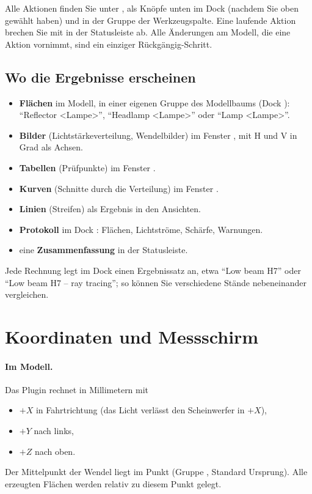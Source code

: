 Alle Aktionen finden Sie unter , als Knöpfe unten im Dock
 (nachdem Sie oben  gewählt haben) und in der Gruppe
 der Werkzeugspalte. Eine laufende Aktion brechen Sie mit  in
der Statusleiste ab. Alle Änderungen am Modell, die eine Aktion vornimmt, sind ein einziger
Rückgängig-Schritt.

\subsection{Wo die Ergebnisse erscheinen}

\begin{itemize}
  \item \textbf{Flächen} im Modell, in einer eigenen Gruppe des Modellbaums (Dock ):
    \enquote{Reflector <Lampe>}, \enquote{Headlamp <Lampe>} oder \enquote{Lamp <Lampe>}.
  \item \textbf{Bilder} (Lichtstärkeverteilung, Wendelbilder) im Fenster , mit H und V in
    Grad als Achsen.
  \item \textbf{Tabellen} (Prüfpunkte) im Fenster .
  \item \textbf{Kurven} (Schnitte durch die Verteilung) im Fenster .
  \item \textbf{Linien} (Streifen) als Ergebnis in den Ansichten.
  \item \textbf{Protokoll} im Dock : Flächen, Lichtströme, Schärfe, Warnungen.
  \item eine \textbf{Zusammenfassung} in der Statusleiste.
\end{itemize}

Jede Rechnung legt im Dock  einen Ergebnissatz an, etwa \enquote{Low beam H7} oder
\enquote{Low beam H7 – ray tracing}; so können Sie verschiedene Stände nebeneinander vergleichen.

\section{Koordinaten und Messschirm}\label{sec:al-koordinaten}

\paragraph{Im Modell.} Das Plugin rechnet in Millimetern mit
\begin{itemize}
  \item $+X$ in Fahrtrichtung (das Licht verlässt den Scheinwerfer in $+X$),
  \item $+Y$ nach links,
  \item $+Z$ nach oben.
\end{itemize}
Der Mittelpunkt der Wendel liegt im Punkt  (Gruppe , Standard
Ursprung). Alle erzeugten Flächen werden relativ zu diesem Punkt gelegt.

